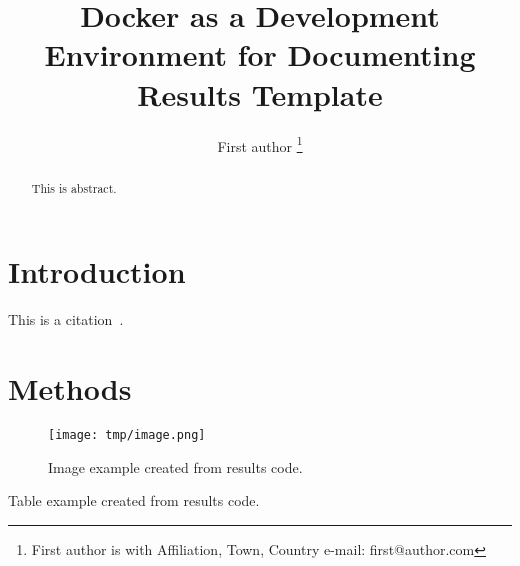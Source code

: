 \documentclass{article}
\begin{document}

\title{Docker as a Development Environment for Documenting Results Template}

\author{First author
\thanks{First author is with Affiliation, Town, Country e-mail: first@author.com}}

\maketitle

\begin{abstract}
	This is abstract.
\end{abstract}

\section{Introduction}
This is a citation~\cite{author2000title}.

\section{Methods}

\begin{figure}
	\texttt{[image: tmp/image.png]}
	\caption{Image example created from results code.}
	\label{fig:image}
\end{figure}

\begin{table}
	\centering
	\caption{Table example created from results code.}
	\label{table:table}
	\setlength\tabcolsep{4.2pt}
	
\end{table}



\end{document}
